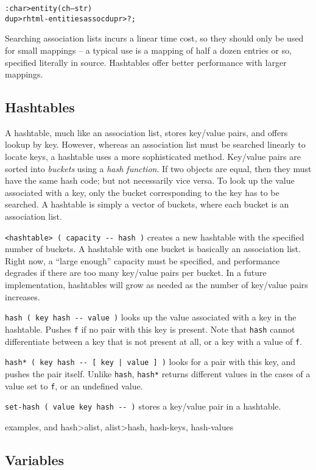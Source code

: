 \documentclass[english]{article}
\begin{document}
{\begin{alltt}
: char>entity ( ch -- str )
    dup >r html-entities assoc dup r> ? ;
\end{alltt}

Searching association lists incurs a linear time cost, so they should
only be used for small mappings -- a typical use is a mapping of half
a dozen entries or so, specified literally in source. Hashtables offer
better performance with larger mappings.

\subsection{Hashtables}

A hashtable, much like an association list, stores key/value pairs, and offers lookup by key. However, whereas an association list must be searched linearly to locate keys, a hashtable uses a more sophisticated method. Key/value pairs are sorted into \emph{buckets} using a \emph{hash function}. If two objects are equal, then they must have the same hash code; but not necessarily vice versa. To look up the value associated with a key, only the bucket corresponding to the key has to be searched. A hashtable is simply a vector of buckets, where each bucket is an association list.

\texttt{<hashtable> ( capacity -{}- hash )} creates a new hashtable with the specified number of buckets. A hashtable with one bucket is basically an association list. Right now, a ``large enough'' capacity must be specified, and performance degrades if there are too many key/value pairs per bucket. In a future implementation, hashtables will grow as needed as the number of key/value pairs increases.

\texttt{hash ( key hash -{}- value )} looks up the value associated with a key in the hashtable. Pushes \texttt{f} if no pair with this key is present. Note that \texttt{hash} cannot differentiate between a key that is not present at all, or a key with a value of \texttt{f}.

\texttt{hash* ( key hash -{}- {[} key | value {]} )} looks for
a pair with this key, and pushes the pair itself. Unlike \texttt{hash},
\texttt{hash{*}} returns different values in the cases of a value
set to \texttt{f}, or an undefined value.

\texttt{set-hash ( value key hash -{}- )} stores a key/value pair in a hashtable.

examples, and hash>alist, alist>hash, hash-keys, hash-values

\subsection{Variables}

}
\end{document}
